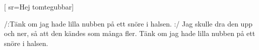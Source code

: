 
[ 					
	sr={Hej tomtegubbar}]	
	
\beginverse*						
/:Tänk om jag hade lilla nubben
på ett snöre i halsen. :/
Jag skulle dra den upp och ner,
så att den kändes som många fler.
Tänk om jag hade lilla nubben
på ett snöre i halsen.
\endverse						

\vspace{5mm}	
\endsong		
		
